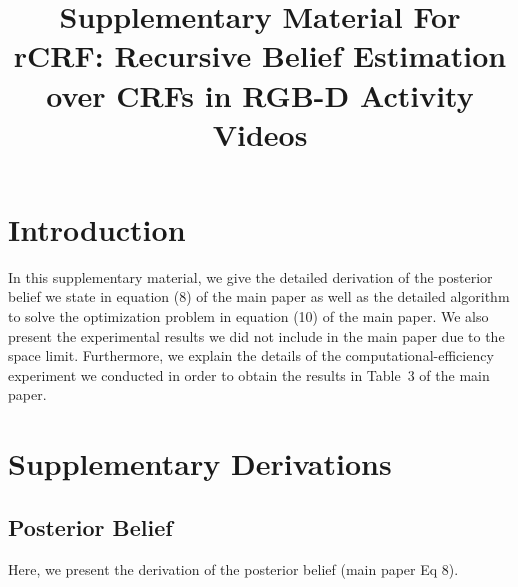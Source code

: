 \documentclass[conference]{IEEEtran}
\begin{document}
\title{Supplementary Material For \\ rCRF: Recursive Belief Estimation over CRFs in RGB-D Activity Videos}

\author{
\and
{}
}


\maketitle

\IEEEpeerreviewmaketitle

\section{Introduction}
In this supplementary material, we give the detailed derivation of the posterior belief we state in equation (8) of the main paper as well as the detailed algorithm to solve the optimization problem in equation (10) of the main paper. We also present the experimental results we did not include in the main paper due to the space limit. Furthermore, we explain the details of the computational-efficiency experiment we conducted in order to obtain the results in Table~3 of the main paper.
\section{Supplementary Derivations}
\subsection{Posterior Belief}
Here, we present the derivation of the posterior belief (main paper Eq 8).
\end{document}

